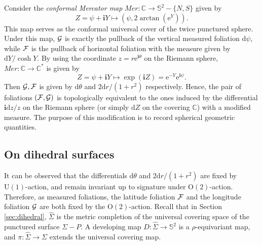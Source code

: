 \documentclass[pdflatex,sn-mathphys]{sn-jnl}%
\numberwithin{equation}{section}
\theoremstyle{thmstyleone}%
\newcommand{\CC}{\mathbb{C}}
\newcommand{\ii}{\mathbf{i}}
\newcommand{\STwo}{\mathbb{S}^2}
\newcommand{\Uone}{\mathrm{U}(1)}
\newcommand{\Otwo}{\mathrm{O}(2)}
\newcommand{\mfoli}{measured foliation}
\newcommand{\csphsf}{cone spherical surface}
\newcommand{\DEF}{\emph}
\begin{document}
\bigskip
Consider the \DEF{conformal Mercator map} $Mer:\CC \to \STwo-\{N,S\}$ given by
    \begin{equation}
        Z=\psi+\ii Y \longmapsto \left( \psi, 2\arctan(\mathrm{e}^Y) \right).
    \end{equation}
This map serves as the conformal universal cover of the twice punctured sphere. Under this map, $\mathcal{G}$ is exactly the pullback of the vertical measured foliation $\mathrm{d}\psi$, while $\mathcal{F}$ is the pullback of horizontal foliation with the measure given by $\mathrm{d}Y/\cosh Y$. 
By using the coordinate $z=r\mathrm{e}^{\ii\theta}$ on the Riemann sphere, $Mer:\CC\to\CC^*$ is given by
    \begin{equation}
        Z = \psi+\ii Y \longmapsto \exp(\ii Z) = \mathrm{e}^{-Y}\mathrm{e}^{\ii\psi}.
    \end{equation}
Then $\mathcal{G}, \mathcal{F}$ is given by $\mathrm{d}\theta$ and $2\mathrm{d}r/(1+r^2)$ respectively. 
Hence, the pair of foliations $(\mathcal{F}, \mathcal{G})$ is topologically equivalent to the ones induced by the differential $\ii \mathrm{d}z / z$ on the Riemann sphere (or simply $\mathrm{d}Z$ on the covering $\CC$) with a modified measure. The purpose of this modification is to record spherical geometric quantities.

\subsection{On dihedral surfaces}\label{sec:ll_foli}
It can be observed that the differentials $\mathrm{d}\theta$ and $2\mathrm{d}r/(1+r^2)$ are fixed by $\Uone$-action, and remain invariant up to signature under $\Otwo$-action. Therefore, as \mfoli s, the latitude foliation $\mathcal{F}$ and the longitude foliation $\mathcal{G}$ are both fixed by the $\Otwo$-action.
Recall that in Section \ref{sec:dihedral}, $\hat{\Sigma}$ is the metric completion of the universal covering space of the punctured surface $\Sigma-P$. A developing map $D:\hat{\Sigma}\to\STwo$ is a $\rho$-equivariant map, and $\pi:\hat{\Sigma}\to\Sigma$ extends the universal covering map.
\end{document}
